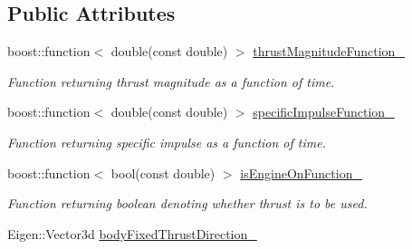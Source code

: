 \subsection*{Public Attributes}
\begin{DoxyCompactItemize}
\item 
boost\+::function$<$ double(const double) $>$ \hyperlink{classtudat_1_1simulation__setup_1_1FromFunctionThrustEngineSettings_a9256d086b1602cbe688021221add658d}{thrust\+Magnitude\+Function\+\_\+}\hypertarget{classtudat_1_1simulation__setup_1_1FromFunctionThrustEngineSettings_a9256d086b1602cbe688021221add658d}{}\label{classtudat_1_1simulation__setup_1_1FromFunctionThrustEngineSettings_a9256d086b1602cbe688021221add658d}

\begin{DoxyCompactList}\small\item\em Function returning thrust magnitude as a function of time. \end{DoxyCompactList}\item 
boost\+::function$<$ double(const double) $>$ \hyperlink{classtudat_1_1simulation__setup_1_1FromFunctionThrustEngineSettings_af14fa51bb87d9112083ceb31f187da18}{specific\+Impulse\+Function\+\_\+}\hypertarget{classtudat_1_1simulation__setup_1_1FromFunctionThrustEngineSettings_af14fa51bb87d9112083ceb31f187da18}{}\label{classtudat_1_1simulation__setup_1_1FromFunctionThrustEngineSettings_af14fa51bb87d9112083ceb31f187da18}

\begin{DoxyCompactList}\small\item\em Function returning specific impulse as a function of time. \end{DoxyCompactList}\item 
boost\+::function$<$ bool(const double) $>$ \hyperlink{classtudat_1_1simulation__setup_1_1FromFunctionThrustEngineSettings_a2913a446ced9aea760305e3cc00715c9}{is\+Engine\+On\+Function\+\_\+}\hypertarget{classtudat_1_1simulation__setup_1_1FromFunctionThrustEngineSettings_a2913a446ced9aea760305e3cc00715c9}{}\label{classtudat_1_1simulation__setup_1_1FromFunctionThrustEngineSettings_a2913a446ced9aea760305e3cc00715c9}

\begin{DoxyCompactList}\small\item\em Function returning boolean denoting whether thrust is to be used. \end{DoxyCompactList}\item 
Eigen\+::\+Vector3d \hyperlink{classtudat_1_1simulation__setup_1_1FromFunctionThrustEngineSettings_a3f613809d13fc50c27531dcb4164c355}{body\+Fixed\+Thrust\+Direction\+\_\+}\hypertarget{classtudat_1_1simulation__setup_1_1FromFunctionThrustEngineSettings_a3f613809d13fc50c27531dcb4164c355}{}\label{classtudat_1_1simulation__setup_1_1FromFunctionThrustEngineSettings_a3f613809d13fc50c27531dcb4164c355}


\end{DoxyCompactItemize}
